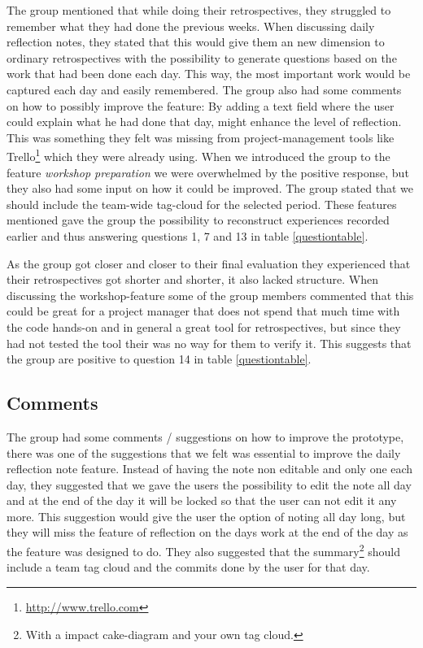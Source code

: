 The group mentioned that while doing their retrospectives, they struggled to remember what they had done the previous weeks. When discussing daily reflection notes, they stated that this would give them an new dimension to ordinary retrospectives with the possibility to generate questions based on the work that had been done each day. This way, the most important work would be captured each day and easily remembered. The group also had some comments on how to possibly improve the feature: By adding a text field where the user could explain what he had done that day, might enhance the level of reflection. This was something they felt was missing from project-management tools like Trello\footnote{\url{http://www.trello.com}} which they were already using. When we introduced the group to the feature \emph{workshop preparation} we were overwhelmed by the positive response, but they also had some input on how it could be improved. The group stated that we should include the team-wide tag-cloud for the selected period. These features mentioned gave the group the possibility to reconstruct experiences recorded earlier and thus answering questions 1, 7 and 13 in table \ref{questiontable}.

As the group got closer and closer to their final evaluation they experienced that their retrospectives got shorter and shorter, it also lacked structure. When discussing the workshop-feature some of the group members commented that this could be great for a project manager that does not spend that much time with the code hands-on and in general a great tool for retrospectives, but since they had not tested the tool their was no way for them to verify it. This suggests that the group are positive to question 14 in table \ref{questiontable}.

\subsection{Comments}
The group had some comments / suggestions on how to improve the prototype, there was one of the suggestions that we felt was essential to improve the daily reflection note feature. Instead of having the note non editable and only one each day, they suggested that we gave the users the possibility to edit the note all day and at the end of the day it will be locked so that the user can not edit it any more. This suggestion would give the user the option of noting all day long, but they will miss the feature of reflection on the days work at the end of the day as the feature was designed to do. They also suggested that the summary\footnote{With a impact cake-diagram and your own tag cloud.} should include a team tag cloud and the commits done by the user for that day.

